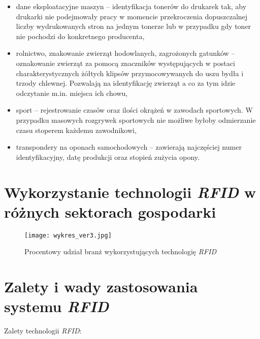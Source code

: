 \begin{itemize}
	\item dane eksploatacyjne maszyn – identyfikacja tonerów do drukarek tak, aby drukarki nie podejmowały pracy w momencie przekroczenia dopuszczalnej liczby wydrukowanych stron na jednym tonerze lub w przypadku gdy toner nie pochodzi do konkretnego producenta, 
	
	\item rolnictwo, znakowanie zwierząt hodowlanych, zagrożonych gatunków – oznakowanie zwierząt za pomocą znaczników występujących w postaci charakterystycznych żółtych klipsów przymocowywanych do uszu bydła i trzody chlewnej. Pozwalają na identyfikację zwierząt a co za tym idzie odczytanie m.in. miejsca ich chowu,
	
	\item sport – rejestrowanie czasów oraz ilości okrążeń w zawodach sportowych.  W przypadku masowych rozgrywek sportowych  nie możliwe byłoby odmierzanie czasu stoperem każdemu zawodnikowi,
	
	\item transpondery na oponach samochodowych – zawierają najczęściej numer identyfikacyjny, datę produkcji oraz stopień zużycia opony.

\end{itemize}


\section{Wykorzystanie technologii \emph{RFID} w różnych sektorach gospodarki}

	\begin{figure}[h!]
	\centering
	    \texttt{[image: wykres\_ver3.jpg]}
	    \caption{Procentowy udział branż wykorzystujących technologię \emph{RFID}}
	\end{figure}


\section {Zalety i wady zastosowania systemu \emph{RFID}}

\noindent 
Zalety technologii \emph{RFID}:

